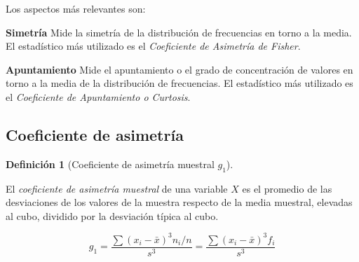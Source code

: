 \documentclass[
  a4paper,
]{scrreport}
\theoremstyle{plain}
\theoremstyle{definition}
\theoremstyle{definition}
\newtheorem{definition}{Definición}[chapter]
\theoremstyle{remark}
\begin{document}
Los aspectos más relevantes son:

\textbf{Simetría} Mide la simetría de la distribución de frecuencias en
torno a la media. El estadístico más utilizado es el \emph{Coeficiente
de Asimetría de Fisher}.

\textbf{Apuntamiento} Mide el apuntamiento o el grado de concentración
de valores en torno a la media de la distribución de frecuencias. El
estadístico más utilizado es el \emph{Coeficiente de Apuntamiento o
Curtosis}.

\subsection{Coeficiente de asimetría}\label{coeficiente-de-asimetruxeda}

\begin{definition}[Coeficiente de asimetría muestral
\(g_1\)]\protect\hypertarget{def-coeficiente-asimetria}{}\label{def-coeficiente-asimetria}

El \emph{coeficiente de asimetría muestral} de una variable \(X\) es el
promedio de las desviaciones de los valores de la muestra respecto de la
media muestral, elevadas al cubo, dividido por la desviación típica al
cubo.

\[g_1 = \frac{\sum (x_i-\bar x)^3 n_i/n}{s^3} = \frac{\sum (x_i-\bar x)^3 f_i}{s^3}\]

\end{definition}
\end{document}
